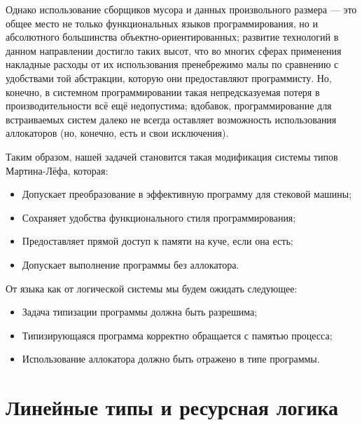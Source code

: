 \documentclass[12pt]{article}
\begin{document}
Однако использование сборщиков мусора и данных произвольного размера --- это
общее место не только функциональных языков программирования, но и абсолютного
большинства объектно-ориентированных; развитие технологий в данном направлении
достигло таких высот, что во многих сферах применения накладные расходы от их
использования пренебрежимо малы по сравнению с удобствами той абстракции,
которую они предоставляют программисту. Но, конечно, в системном
программировании такая непредсказуемая потеря в производительности всё ещё
недопустима; вдобавок, программирование для встраиваемых систем далеко не всегда
оставляет возможность использования аллокаторов (но, конечно, есть и свои
исключения).

Таким образом, нашей задачей становится такая модификация системы типов
Мартина-Лёфа, которая:

\begin{itemize}
  \item Допускает преобразование в эффективную программу для стековой машины;
  \item Сохраняет удобства функционального стиля программирования;
  \item Предоставляет прямой доступ к памяти на куче, если она есть;
  \item Допускает выполнение программы без аллокатора.
\end{itemize}

От языка как от логической системы мы будем ожидать следующее:

\begin{itemize}
  \item Задача типизации программы должна быть разрешима;
  \item Типизирующаяся программа корректно обращается с памятью процесса;
  \item Использование аллокатора должно быть отражено в типе программы.
\end{itemize}

\section{Линейные типы и ресурсная логика}
\end{document}
